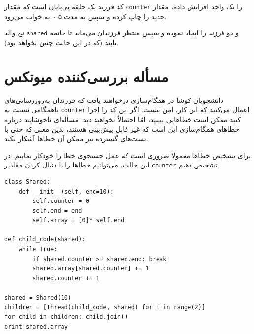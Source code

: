 \documentclass{book}
\begin{document}
    کد فرزند یک حلقه بی‌پایان است که مقدار {\tt counter} را یک واحد افزایش داده، مقدار جدید را چاپ کرده و سپس به مدت ۰.۵ به خواب می‌رود. 

    نخ والد  {\tt shared} و دو فرزند را ایجاد نموده و سپس منتظر فرزندان می‌ماند تا خاتمه یابند (که در این حالت چنین نخواهد بود).

\section{مسأله بررسی‌کننده میوتکس}

    دانشجویان کوشا در همگام‌سازی درخواهند یافت که فرزندان به‌روزرسانی‌های ناهمگامی نسبت به {\tt counter} اعمال می‌کنند که این کار، امن نیست. 
    اگر این کد را اجرا کنید ممکن است خطاهایی ببینید، امّا احتمالاً نخواهید دید. مسأله‌ای ناخوشایند درباره خطاهای همگام‌سازی این است که غیر قابل پیش‌بینی هستند، 
    بدین معنی که حتی با تست‌های  گسترده نیز  ممکن آن خطاها  آشکار نکند.
    

    برای تشخیص خطاها معمولا ضروری است که عمل جستجوی خطا را خودکار نماییم. 
    در این حالت، می‌توانیم خطاها را با دنبال کردن مقادیر  {\tt counter} تشخیص دهیم. 

\begin{latin}
\begin{lstlisting}
class Shared:
    def __init__(self, end=10):
        self.counter = 0
        self.end = end
        self.array = [0]* self.end

def child_code(shared):
    while True:
        if shared.counter >= shared.end: break
        shared.array[shared.counter] += 1
        shared.counter += 1

shared = Shared(10)
children = [Thread(child_code, shared) for i in range(2)]
for child in children: child.join()
print shared.array
\end{lstlisting}
\end{latin}
\end{document}

